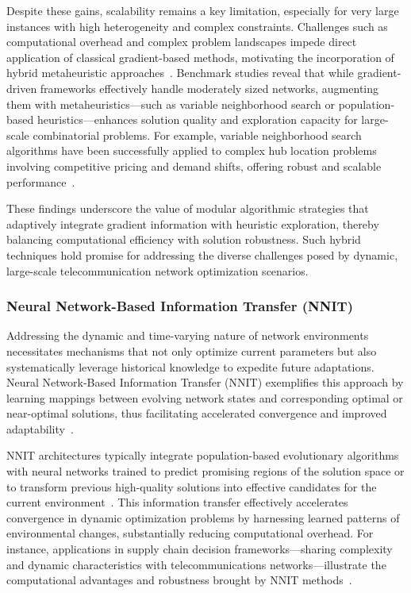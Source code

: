 \documentclass[sigconf]{acmart}
\begin{document}
Despite these gains, scalability remains a key limitation, especially for very large instances with high heterogeneity and complex constraints. Challenges such as computational overhead and complex problem landscapes impede direct application of classical gradient-based methods, motivating the incorporation of hybrid metaheuristic approaches~\cite{ref37}. Benchmark studies reveal that while gradient-driven frameworks effectively handle moderately sized networks, augmenting them with metaheuristics—such as variable neighborhood search or population-based heuristics—enhances solution quality and exploration capacity for large-scale combinatorial problems. For example, variable neighborhood search algorithms have been successfully applied to complex hub location problems involving competitive pricing and demand shifts, offering robust and scalable performance~\cite{ref37}.

These findings underscore the value of modular algorithmic strategies that adaptively integrate gradient information with heuristic exploration, thereby balancing computational efficiency with solution robustness. Such hybrid techniques hold promise for addressing the diverse challenges posed by dynamic, large-scale telecommunication network optimization scenarios.

\subsubsection{Neural Network-Based Information Transfer (NNIT)}

Addressing the dynamic and time-varying nature of network environments necessitates mechanisms that not only optimize current parameters but also systematically leverage historical knowledge to expedite future adaptations. Neural Network-Based Information Transfer (NNIT) exemplifies this approach by learning mappings between evolving network states and corresponding optimal or near-optimal solutions, thus facilitating accelerated convergence and improved adaptability~\cite{ref38,ref39,ref40,ref47}.

NNIT architectures typically integrate population-based evolutionary algorithms with neural networks trained to predict promising regions of the solution space or to transform previous high-quality solutions into effective candidates for the current environment~\cite{ref47}. This information transfer effectively accelerates convergence in dynamic optimization problems by harnessing learned patterns of environmental changes, substantially reducing computational overhead. For instance, applications in supply chain decision frameworks—sharing complexity and dynamic characteristics with telecommunications networks—illustrate the computational advantages and robustness brought by NNIT methods~\cite{ref38}.
\end{document}
